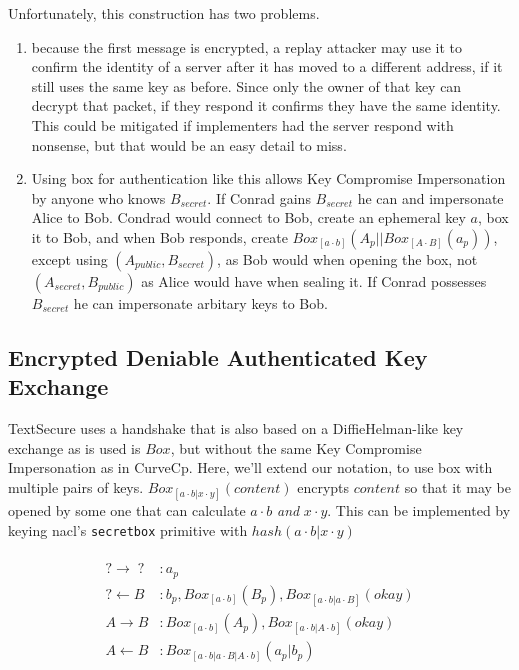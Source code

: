 \documentclass[12pt]{article}
\begin{document}
Unfortunately, this construction has two problems.
\begin{enumerate}
\item because the first message is encrypted, a replay attacker may
  use it to confirm the identity of a server after it has moved
  to a different address, if it still uses the same key as before.
  Since only the owner of that key can decrypt that packet,
  if they respond it confirms they have the same identity.
  This could be mitigated if implementers had the server
  respond with nonsense, but that would be an easy detail to miss.

\item Using box for authentication like this allows Key Compromise
  Impersonation by anyone who knows $B_{secret}$. If Conrad gains
  $B_{secret}$ he can and impersonate Alice to Bob.
  Condrad would connect to Bob, create an ephemeral key $a$,
  box it to Bob, and when Bob responds, create
  $Box_{[a\cdot b]}(A_p||Box_{[A \cdot B]}(a_p))$, except using $(A_{public}, B_{secret})$,
  as Bob would when opening the box, not $(A_{secret}, B_{public})$ as Alice would
  have when sealing it. If Conrad possesses $B_{secret}$ he can impersonate arbitary
  keys to Bob.
\end{enumerate}

\subsection{Encrypted Deniable Authenticated Key Exchange}

TextSecure uses a handshake that is also based on a DiffieHelman-like
key exchange as is used is $Box$, but without the same Key Compromise
Impersonation as in CurveCp. Here, we'll extend our notation, to use
box with multiple pairs of keys.
$Box_{[a\cdot b | x \cdot y]}(content)$ encrypts $content$ so that
it may be opened by some one that can calculate
$a \cdot b$ \emph{and} $x \cdot y$. This can be implemented by
keying nacl's \texttt{secretbox} primitive with $hash(a\cdot b | x \cdot y)$

$$
\begin{align*}
\\
    ? \to \;?\; &: a_p \\
    ? \gets B &: b_p, Box_{[a\cdot b]}(B_p), Box_{[a\cdot b|a\cdot B]}(okay) \\
    A \to B &: Box_{[a\cdot b]}(A_p), Box_{[a\cdot b|A\cdot b]}(okay) \\
    A \gets B &: Box_{[a \cdot b | a \cdot B | A \cdot b]}(a_p|b_p)\\
\\
\end{align*}
$$
\end{document}
